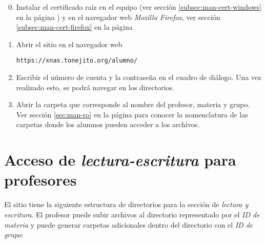 {
\linespread{1}
\begin{enumerate}
\setcounter{enumi}{-1} %

  \item Instalar el certificado ra\'{i}z en el equipo (ver secci\'{o}n \ref{subsec:man-cert-windows} en la p\'{a}gina \pageref{subsec:man-cert-windows}) y en el navegador web \textsl{Mozilla Firefox}, ver secci\'{o}n \ref{subsec:man-cert-firefox} en la p\'{a}gina \pageref{subsec:man-cert-firefox}

  \item Abrir el sitio en el navegador web

    \texttt{https://xnas.tonejito.org/alumno/}


  \item Escribir el n\'{u}mero de cuenta y la contrase\~{n}a en el cuadro de di\'{a}logo. Una vez realizado esto, se podr\'{a} navegar en los directorios.


  \item Abrir la carpeta que corresponde al nombre del profesor, materia y grupo. Ver secci\'{o}n \ref{sec:man-ro} en la p\'{a}gina \pageref{sec:man-ro} para conocer la nomenclatura de las carpetas donde los alumnos pueden acceder a los archivos.

\end{enumerate}
}

\newpage

    \section {Acceso de \textsl{lectura-escritura} para profesores}
    \label{sec:man-rw}


El sitio tiene la siguiente estructura de directorios para la secci\'{o}n de \textit{lectura y escritura}. El profesor puede subir archivos al directorio representado por el \emph{ID de materia} y puede generar carpetas adicionales dentro del directorio con el \emph{ID de grupo}:

